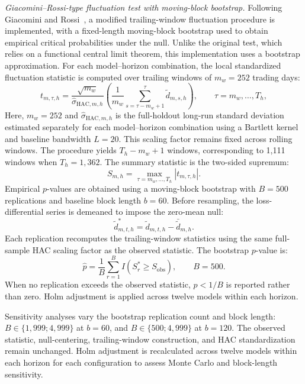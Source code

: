 \documentclass[runningheads,orivec]{llncs}
\begin{document}
\textit{Giacomini--Rossi-type fluctuation test with moving-block bootstrap.} Following Giacomini and Rossi~\cite{giacomini2010}, a modified trailing-window fluctuation procedure is implemented, with a fixed-length moving-block bootstrap used to obtain empirical critical probabilities under the null. Unlike the original test, which relies on a functional central limit theorem, this implementation uses a bootstrap approximation. For each model--horizon combination, the local standardized fluctuation statistic is computed over trailing windows of $m_w=252$ trading days:
\begin{equation}
t_{m,\tau,h}
=
\frac{\sqrt{m_w}}{\widehat\sigma_{\mathrm{HAC},m,h}}
\left(
\frac{1}{m_w}
\sum_{s=\tau-m_w+1}^{\tau}
\widetilde d_{m,s,h}
\right),
\qquad
\tau=m_w,\ldots,T_h,
\end{equation}
Here, $m_w=252$ and $\widehat\sigma_{\mathrm{HAC},m,h}$ is the full-holdout long-run standard deviation estimated separately for each model--horizon combination using a Bartlett kernel and baseline bandwidth $L=20$. This scaling factor remains fixed across rolling windows. The procedure yields $T_h-m_w+1$ windows, corresponding to 1,111 windows when $T_h=1,362$. The summary statistic is the two-sided supremum:
\begin{equation}
S_{m,h}
=
\max_{\tau=m_w,\ldots,T_h}
|t_{m,\tau,h}|.
\end{equation}
Empirical $p$-values are obtained using a moving-block bootstrap with $B=500$ replications and baseline block length $b=60$. Before resampling, the loss-differential series is demeaned to impose the zero-mean null:
\begin{equation}
\widetilde d^*_{m,t,h} = \widetilde d_{m,t,h} - \bar{\widetilde d}_{m,h}.
\end{equation}
Each replication recomputes the trailing-window statistics using the same full-sample HAC scaling factor as the observed statistic. The bootstrap $p$-value is:
\begin{equation}
\widehat p = \frac{1}{B} \sum_{r=1}^{B} I(S_r^* \geq S_{\mathrm{obs}}), \qquad B=500.
\end{equation}
When no replication exceeds the observed statistic, $p<1/B$ is reported rather than zero. Holm adjustment is applied across twelve models within each horizon.

Sensitivity analyses vary the bootstrap replication count and block length: $B\in\{1,999;4,999\}$ at $b=60$, and $B\in\{500;4,999\}$ at $b=120$. The observed statistic, null-centering, trailing-window construction, and HAC standardization remain unchanged. Holm adjustment is recalculated across twelve models within each horizon for each configuration to assess Monte Carlo and block-length sensitivity.
\end{document}
